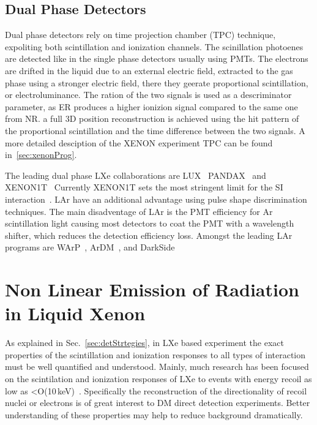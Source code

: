 \subsection{Dual Phase Detectors}
\label{sec:dualPhase}

Dual phase detectors rely on time projection chamber (TPC) technique, expoliting both scintillation and ionization channels. The scinillation photoenes are detected like in the single phase detectors usually using PMTs. The electrons are drifted in the liquid due to an external electric field, extracted to the gas phase using a stronger electric field, there they geerate proportional scintillation, or electroluminance. The ration of the two signals is used as a descriminator parameter, as ER produces a higher ionizion signal compared to the same one from NR. a full 3D position reconstruction is achieved using the hit pattern of the proportional scintillation and the time difference between the two signals. A more detailed desciption of the XENON experiment TPC can be found in~\ref{sec:xenonProg}.

The leading dual phase LXe collaborations are LUX~\cite{Akerib:2012ys} PANDAX~\cite{Cao:2014jsa} and XENON1T~\cite{Aprile:2017aty} Currently XENON1T sets the most stringent limit for the SI interaction~\cite{Xenon1TResults}. LAr have an additional advantage using  pulse shape discrimination techniques. The main disadventage of LAr is the PMT efficiency for Ar scintillation light causing most detectors to coat the PMT with a wavelength shifter, which reduces the detection efficiency loss. Amongst the leading LAr programs are WArP~\cite{Zani:2014lea}, ArDM~\cite{Rubbia:2005ge}, and DarkSide~\cite{Alexander:2013hia}  

\section{Non Linear Emission of Radiation in Liquid Xenon}
\label{sec:intro_superradiance}
As explained in Sec.~\ref{sec:detStrtegies}, in LXe based experiment the exact properties of the scintillation and ionization responses to all types of interaction must be well quantified and understood. Mainly, much research has been focused on the scintilation and ionization responses of LXe to events with energy recoil as low as <O(10\,keV)~\cite{Manzur:2009hp,Aprile:2012an,Baudis:2013cca,Akerib:2016mzi}.
Specifically the reconstruction of the directionality of recoil nuclei or electrons is of great interest to DM direct detection experiments. Better understanding of these properties may help to reduce background dramatically.

